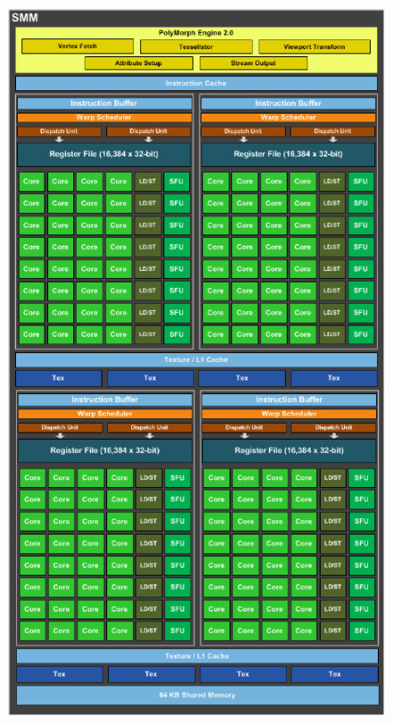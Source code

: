 \documentclass[10pt, compress]{beamer}
\begin{document}
{\begin{minipage}{0.4\textwidth}
\begin{figure}[htpb]
 \centering
\includegraphics[scale=0.3]{maxwell-smm}
\label{fig:maxwellSMM}
\end{figure}
\end{minipage}
}
\end{document}
